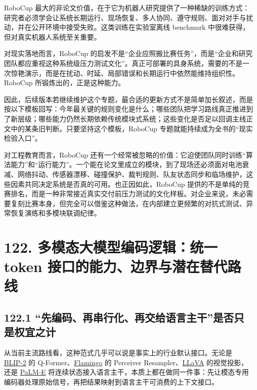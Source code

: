 RoboCup 最大的非论文价值，在于它为机器人研究提供了一种稀缺的训练方式：研究者必须学会让系统长期运行、现场恢复、多人协同、遵守规则、面对对手与扰动，并在公开环境中接受失败。这类训练在实验室离线 benchmark 中很难获得，但对真实机器人系统至关重要。

对现实落地而言，RoboCup 的启发不是“企业应照搬比赛任务”，而是“企业和研究团队都应重视这种系统级压力测试文化”。真正可部署的具身系统，需要的不是一次惊艳演示，而是在扰动、时延、局部错误和长期运行中依然能维持组织性。RoboCup 所锻炼出的，正是这种能力。

因此，后续版本若继续维护这个专题，最合适的更新方式不是简单加长叙述，而是按以下模板回写：今年最关键的规则变化是什么；哪些团队把学习路线真正推进到了新层级；哪些能力仍然长期依赖传统模块式系统；这些变化是否足以回调主线正文中的某条旧判断。只要坚持这个模板，RoboCup 专题就能持续成为全书的“现实检验入口”。

对工程教育而言，RoboCup 还有一个经常被忽略的价值：它迫使团队同时训练“算法能力”和“运行能力”。一个能在论文里成立的模块，到了现场还必须面对电池衰减、网络抖动、传感器漂移、碰撞保护、裁判规则、队友状态同步和临场维护，这些因素共同决定系统是否真的可用。也正因如此，RoboCup 提供的不是单纯的竞赛排名，而是一种非常接近真实交付前压力测试的文化样板。对企业来说，未必需要复刻比赛本身，但完全可以借鉴这种做法，在内部建立更频繁的对抗式测试、异常恢复演练和多模块联调纪律。

\section*{122. 多模态大模型编码逻辑：统一 token 接口的能力、边界与潜在替代路线}

\subsection*{122.1 “先编码、再串行化、再交给语言主干”是否只是权宜之计}


从当前主流路线看，这种范式几乎可以说是事实上的行业默认接口。无论是 \href{https://arxiv.org/abs/2301.12597}{BLIP-2} 的 Q-Former、\href{https://arxiv.org/abs/2204.14198}{Flamingo} 的 Perceiver Resampler、\href{https://arxiv.org/abs/2304.08485}{LLaVA} 的视觉投影，还是 \href{https://arxiv.org/abs/2303.03378}{PaLM-E} 将连续状态接入语言主干，本质上都在做同一件事：先让模态专用编码器处理原始信号，再把结果映射到语言主干可消费的上下文接口。

